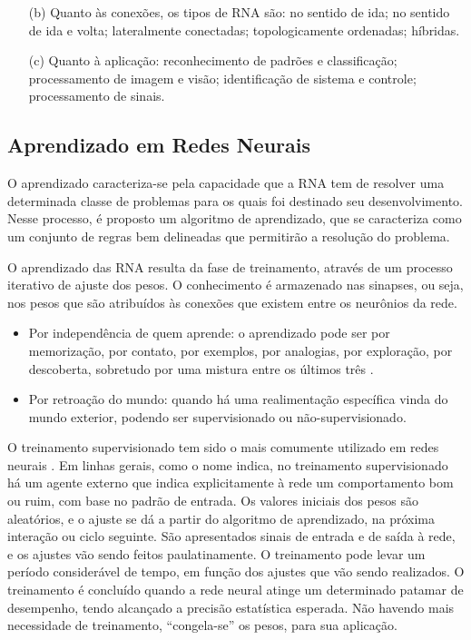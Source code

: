 \begin{itemize}
\begin{enumerate}
	\end{enumerate}

\pagebreak
	
  \item [(b)] Quanto às conexões, os tipos de RNA são: no sentido de ida; no sentido de ida e volta; 
	      lateralmente conectadas; topologicamente ordenadas; híbridas.
  
  \item [(c)] Quanto à aplicação: reconhecimento de padrões e classificação; processamento de imagem e visão; 
	      identificação de sistema e controle; processamento de sinais.
\end{itemize}


\subsection{Aprendizado em Redes Neurais}

O aprendizado caracteriza-se pela capacidade que a RNA tem de resolver uma determinada classe de problemas para os quais foi destinado 
seu desenvolvimento. 
Nesse processo, é proposto um algoritmo de aprendizado, que se caracteriza como um conjunto de regras bem delineadas que permitirão a 
resolução do problema. 

O aprendizado das RNA resulta da fase de treinamento, através de um processo iterativo de ajuste dos pesos. 
O conhecimento é armazenado nas sinapses, ou seja, nos pesos que são atribuídos às conexões que existem entre os neurônios da rede.

\begin{itemize}
 \item Por independência de quem aprende: o aprendizado pode ser por memorização, por contato, por exemplos, por analogias, por 
	exploração, por descoberta, sobretudo por uma mistura entre os últimos três \cite{Barreto2002}.
 \item Por retroação do mundo: quando há uma realimentação específica vinda do mundo exterior, podendo ser supervisionado ou 
	não-supervisionado. 
\end{itemize}

O treinamento supervisionado tem sido o mais comumente utilizado em redes neurais \cite{Barreto2002}. 
Em linhas gerais, como o nome indica, no treinamento supervisionado há um agente externo que indica explicitamente à rede um 
comportamento bom ou ruim, com base no padrão de entrada. Os valores iniciais dos pesos são aleatórios, e o ajuste se dá a partir do 
algoritmo de aprendizado, na próxima interação ou ciclo seguinte. São apresentados sinais de entrada e de saída à rede, e os ajustes 
vão sendo feitos paulatinamente. O treinamento pode levar um período considerável de tempo, em função dos ajustes que vão sendo 
realizados. O treinamento é concluído quando a rede neural atinge um determinado patamar de desempenho, tendo alcançado a precisão 
estatística esperada. 
Não havendo mais necessidade de treinamento, “congela-se” os pesos, para sua aplicação. 

